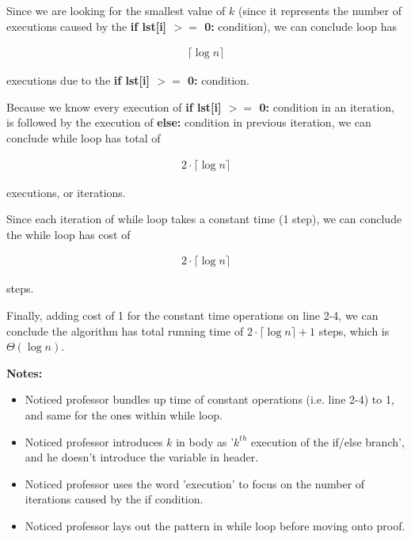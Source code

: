 \documentclass[12pt]{article}
\begin{document}
\begin{enumerate}[a.]
\begin{mdframed}
        Since we are looking for the smallest value of $k$ (since it represents the
        number of \color{red}executions caused by the \textbf{if lst[i] $>=$ 0:} condition\color{black}),
        we can conclude loop has

        \begin{align}
            \lceil \log n \rceil
        \end{align}

        \color{red}executions due to the \textbf{if lst[i] $>=$ 0:} condition\color{black}.

        \bigskip

        \color{red}
        Because we know every execution of \textbf{if lst[i] $>=$ 0:} condition in an iteration,
        is followed by the execution of \textbf{else:} condition in previous iteration,
        we can conclude while loop has total of

        \begin{align}
            2 \cdot \lceil \log n \rceil
        \end{align}

        executions, or iterations.
        \color{black}

        \bigskip

        Since each iteration of while loop takes a constant time (1 step), we can
        conclude the while loop has cost of

        \color{red}
        \begin{align}
            2 \cdot \lceil \log n \rceil
        \end{align}
        \color{black}

        steps.

        \bigskip

        Finally, \color{red}adding cost of 1 for the constant time operations on line 2-4\color{black},
        we can conclude the algorithm has total running time of
        \color{red}$2 \cdot \lceil \log n \rceil + 1$ steps\color{black},
        which is $\Theta(\log n)$.

    \end{mdframed}

    \bigskip

    \textbf{Notes:}

    \begin{itemize}
        \item Noticed professor bundles up time of constant operations (i.e. line 2-4)
        to 1, and same for the ones within while loop.
        \item Noticed professor introduces $k$ in body as '$k^{th}$ execution of
        the if/else branch', and he doesn't introduce the variable in header.
        \item Noticed professor uses the word 'execution' to focus on the number
        of iterations caused by the if condition.
        \item Noticed professor lays out the pattern in while loop before moving
        onto proof.
    \end{itemize}


\end{enumerate}
\end{document}
